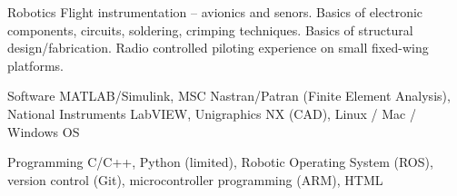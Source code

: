 

\begin{cvleftskills}

  \cvleftskill
    {Robotics} %
    {Flight instrumentation -- avionics and senors. Basics of electronic components, circuits, soldering, crimping techniques. Basics of structural design/fabrication. Radio controlled piloting experience on small fixed-wing platforms.}

  \cvleftskill
    {Software} %
    {MATLAB/Simulink, MSC Nastran/Patran (Finite Element Analysis), National Instruments LabVIEW, Unigraphics NX (CAD), Linux / Mac / Windows OS} %

  \cvleftskill
    {Programming} %
    {C/C++, Python (limited), Robotic Operating System (ROS), version control (Git), microcontroller programming (ARM), HTML} %


\end{cvleftskills}